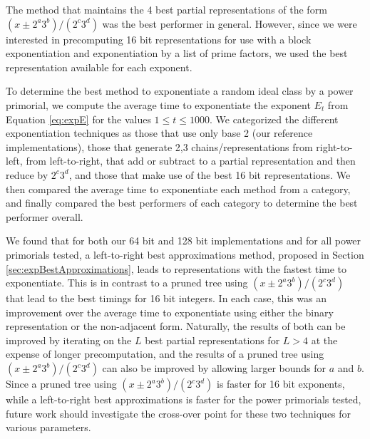 \documentclass{ucalgthes1}
\theoremstyle{definition}
\begin{document}
The method that maintains the 4 best partial representations of the form $(x \pm 2^a3^b)/(2^c3^d)$ was the best performer in general.  However, since we were interested in precomputing 16 bit representations for use with a block exponentiation and exponentiation by a list of prime factors, we used the best representation available for each exponent.

To determine the best method to exponentiate a random ideal class by a power primorial, we compute the average time to exponentiate the exponent $E_t$ from Equation \ref{eq:expE} for the values $1 \le t \le 1000$.  We categorized the different exponentiation techniques as those that use only base 2 (our reference implementations), those that generate 2,3 chains/representations from right-to-left, from left-to-right, that add or subtract to a partial representation and then reduce by $2^c3^d$, and those that make use of the best 16 bit representations.  We then compared the average time to exponentiate each method from a category, and finally compared the best performers of each category to determine the best performer overall.

We found that for both our 64 bit and 128 bit implementations and for all power primorials tested, a left-to-right best approximations method, proposed in Section \ref{sec:expBestApproximations}, leads to representations with the fastest time to exponentiate.  This is in contrast to a pruned tree using $(x \pm 2^a3^b)/(2^c3^d)$ that lead to the best timings for 16 bit integers.  In each case, this was an improvement over the average time to exponentiate using either the binary representation or the non-adjacent form.  Naturally, the results of both can be improved by iterating on the $L$ best partial representations for $L > 4$ at the expense of longer precomputation, and the results of a pruned tree using $(x \pm 2^a3^b)/(2^c3^d)$ can also be improved by allowing larger bounds for $a$ and $b$.  Since a pruned tree using $(x \pm 2^a3^b)/(2^c3^d)$ is faster for 16 bit exponents, while a left-to-right best approximations is faster for the power primorials tested, future work should investigate the cross-over point for these two techniques for various parameters.
\end{document}
